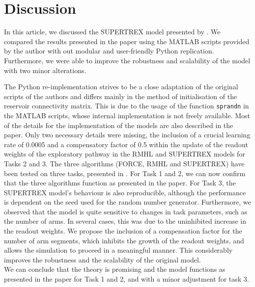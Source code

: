 \section{Discussion}

In this article, we discussed the SUPERTREX model presented by
\textcite{pyle2019}. We compared the results presented in the paper
using the MATLAB scripts provided by the author with out modular and
user-friendly Python replication. Furthermore, we were able to improve
the robustness and scalability of the model with two minor alterations.

The Python re-implementation strives to be a close adaptation of the
original scripts of the authors and differs mainly in the method of
initialisation of the reservoir connectivity matrix. This is due to
the usage of the function {\tt sprandn} in the MATLAB scripts, whose
internal implementation is not freely available. Most of the details for
the implementation of the models are also described in the paper. Only
two necessary details were missing, the inclusion of a crucial
learning rate of 0.0005 and a compensatory factor of 0.5 within the
update of the readout weights of the exploratory pathway in the RMHL
and SUPERTREX models for Tasks 2 and 3.
%
The three algorithms (FORCE, RMHL and SUPERTREX) have been tested on
three tasks, presented in \textcite{pyle2019}. For Task 1 and 2, we
can now confirm that the three algorithms function as presented in the
paper. For Task 3, the SUPERTREX model's behaviour is also
reproducible, although the performance is dependent on the seed used
for the random number generator. Furthermore, we observed that the
model is quite sensitive to changes in task parameters, such as the
number of arms. In several cases, this was due to the uninhibited
increase in the readout weights. We propose the inclusion of a
compensation factor for the number of arm segments, which inhibits the
growth of the readout weights, and allows the simulation to proceed in
a meaningful manner. This considerably improves the robustness and the
scalability of the original model.\\

We can conclude that the theory is promising and the model functions
as presented in the paper for Task 1 and 2, and with a minor adjustment
for task 3.


